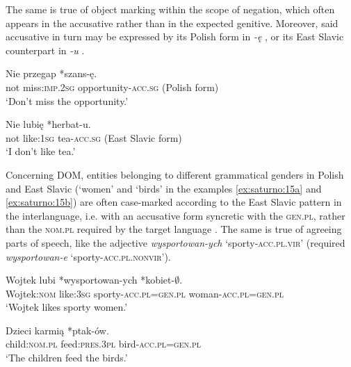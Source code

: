 \documentclass[output=paper,            colorlinks, citecolor=brown            		  ]{langscibook}
\begin{document}
The same is true of object marking within the scope of negation, which often appears in the accusative rather than in the expected genitive. Moreover, said accusative in turn may be expressed by its Polish form in \textit{-ę} , or its East Slavic counterpart in \textit{-u} .

\ea\label{ex:saturno:14}  
    \ea\label{ex:saturno:14a} 
    \gll Nie   przegap     *szans-ę.\\
  not  miss:\textsc{imp.2sg}    {opportunity-\textsc{acc.sg} (Polish form)}\\
  \glt ‘Don’t miss the opportunity.’ 

    \ex\label{ex:saturno:14b}
    \gll Nie   lubię     *herbat-u.\\
  not  like:1\textsc{sg}  {tea-\textsc{acc.sg} (East Slavic form)}\\ 
  \glt ‘I don’t like tea.’
  \z
\z

Concerning DOM, entities belonging to different grammatical genders in Polish and East Slavic (‘women’ and ‘birds’ in the examples \ref{ex:saturno:15a} and \ref{ex:saturno:15b}) are often case-marked according to the East Slavic pattern in the interlanguage, i.e. with an accusative form syncretic with the \textsc{gen.pl}, rather than the \textsc{nom.pl} required by the target language . The same is true of agreeing parts of speech, like the adjective \textit{wysportowan-ych} ‘sporty-\textsc{acc.pl.vir}’ (required \textit{wysportowan-e} ‘sporty-\textsc{acc.pl.nonvir}’).

\ea\label{ex:saturno:15}  
    \ea\label{ex:saturno:15a}
    \gll Wojtek   lubi     *wysportowan-ych   *kobiet-${\emptyset}$.\\
    Wojtek:\textsc{nom}  like:\textsc{3sg}  sporty-\textsc{acc.pl=gen.pl}  woman-\textsc{acc.pl=gen.pl}\\ 
    \glt ‘Wojtek likes sporty women.’

    \ex\label{ex:saturno:15b}
    \gll Dzieci       karmią     *ptak-ów.\\
child\textsc{:nom.pl}    feed:\textsc{pres.3pl}  bird\textsc{{}-acc.pl=gen.pl} \\ 
   \glt ‘The children feed the birds.’
   \z
\z
\end{document}
